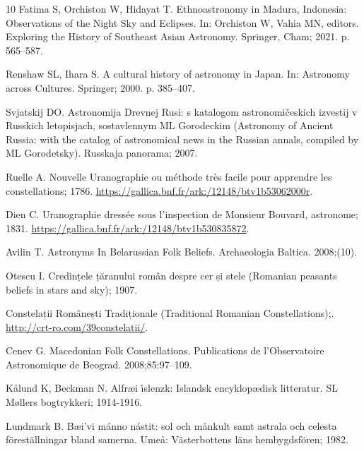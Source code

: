 \documentclass[10pt]{article}
\begin{document}
{\begin{thebibliography}{10}
Fatima S, Orchiston W, Hidayat T.
\newblock Ethnoastronomy in {Madura, Indonesia}: Observations of the Night Sky
  and Eclipses.
\newblock In: Orchiston W, Vahia MN, editors. Exploring the History of
  Southeast Asian Astronomy. Springer, Cham; 2021. p. 565--587.

Renshaw SL, Ihara S.
\newblock A cultural history of astronomy in {Japan}.
\newblock In: Astronomy across Cultures. Springer; 2000. p. 385--407.

Svjatskij DO.
\newblock Astronomija Drevnej Rusi: s katalogom astronomi{\v{c}}eskich izvestij
  v Russkich letopisjach, sostavlennym ML Gorodeckim ({A}stronomy of Ancient
  {R}ussia: with the catalog of astronomical news in the {R}ussian annals,
  compiled by {ML Gorodetsky}).
\newblock Russkaja panorama; 2007.

Ruelle A. {Nouvelle Uranographie} ou m{\'e}thode tr{\`e}s facile pour apprendre
  les constellations; 1786.
\newblock \url{https://gallica.bnf.fr/ark:/12148/btv1b53062000r}.

Dien C. Uranographie dress{\'e}e sous l'inspection de {Monsieur Bouvard},
  astronome; 1831.
\newblock \url{https://gallica.bnf.fr/ark:/12148/btv1b530835872}.

Avilin T.
\newblock Astronyms In {B}elarussian Folk Beliefs.
\newblock Archaeologia Baltica. 2008;(10).

Otescu I.
\newblock Credințele țăranului român despre cer și stele ({R}omanian
  peasants beliefs in stars and sky); 1907.

Constelații Românești Tradiționale ({T}raditional {R}omanian
  Constellations);.
\newblock \url{http://crt-ro.com/39constelatii/}.

Cenev G.
\newblock Macedonian Folk Constellations.
\newblock Publications de l'Observatoire Astronomique de Beograd.
  2008;85:97--109.

K{\aa}lund K, Beckman N.
\newblock Alfr{\ae}{\dh}i {\'\i}slenzk: Islandsk encyklop{\ae}disk litteratur.
\newblock SL M{\o}llers bogtrykkeri; 1914-1916.

Lundmark B.
\newblock B{\ae}i'vi m{\'a}nno n{\'a}stit: sol och m{\aa}nkult samt astrala och
  celesta f{\"o}rest{\"a}llningar bland samerna.
\newblock Ume{\aa}: V{\"a}sterbottens l{\"a}ns hembygdsf{\"o}ren; 1982.


\end{thebibliography}}
\end{document}
